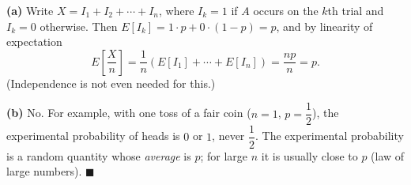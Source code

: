 \textbf{(a)} Write $X=I_1+I_2+\cdots+I_n$, where $I_k=1$ if $A$ occurs on the $k$th trial and $I_k=0$ otherwise. Then $E[I_k]=1\cdot p+0\cdot(1-p)=p$, and by linearity of expectation
\[E\left[\dfrac Xn\right]=\dfrac1n\left(E[I_1]+\cdots+E[I_n]\right)=\dfrac{np}{n}=\boxed{p}.\]
(Independence is not even needed for this.)

\textbf{(b)} No. For example, with one toss of a fair coin ($n=1$, $p=\dfrac12$), the experimental probability of heads is $0$ or $1$, never $\dfrac12$. The experimental probability is a random quantity whose \emph{average} is $p$; for large $n$ it is usually close to $p$ (law of large numbers). $\blacksquare$
